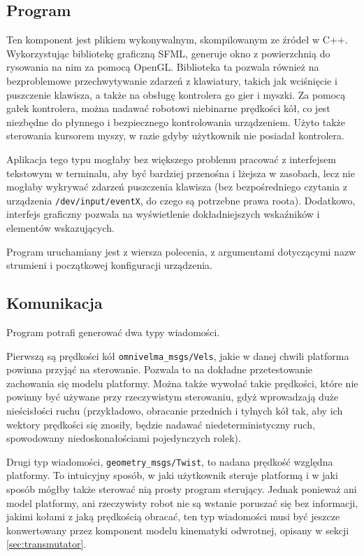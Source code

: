 	\subsection{Program}
		Ten komponent jest plikiem wykonywalnym, skompilowanym ze źródeł w C++.
		Wykorzystując bibliotekę graficzną SFML, generuje okno z powierzchnią do rysowania na nim za pomocą OpenGL.
		Biblioteka ta pozwala również na bezproblemowe przechwytywanie zdarzeń z klawiatury, takich jak wciśnięcie i puszczenie klawisza, a także na obsługę kontrolera go gier i myszki.
		Za pomocą gałek kontrolera, można nadawać robotowi niebinarne prędkości kół, co jest niezbędne do płynnego i bezpiecznego kontrolowania urządzeniem.
		Użyto także sterowania kursorem myszy, w razie gdyby użytkownik nie posiadał kontrolera.
		
		Aplikacja tego typu mogłaby bez większego problemu pracować z interfejsem tekstowym w terminalu, aby być bardziej przenośna i lżejsza w zasobach, 
		lecz nie mogłaby wykrywać zdarzeń puszczenia klawisza
		(bez bezpośredniego czytania z urządzenia \texttt{/dev/input/eventX}, do czego są potrzebne prawa roota). 
		Dodatkowo, interfejs graficzny pozwala na wyświetlenie dokładniejszych wskaźników i elementów wskazujących.
		
		Program uruchamiany jest z wiersza polecenia, z argumentami dotyczącymi nazw strumieni i początkowej konfiguracji urządzenia.
	
	\subsection{Komunikacja}
		Program potrafi generować dwa typy wiadomości.
		
		Pierwszą są prędkości kół \texttt{omnivelma\_msgs/Vels}, jakie w danej chwili platforma powinna przyjąć na sterowanie.
		Pozwala to na dokładne przetestowanie zachowania się modelu platformy.
		Można także wywołać takie prędkości, które nie powinny być używane przy rzeczywistym sterowaniu, gdyż wprowadzają duże nieścisłości ruchu 
		(przykładowo, obracanie przednich i tylnych kół tak, aby ich wektory prędkości się znosiły, będzie nadawać niedeterministyczny ruch, spowodowany niedoskonałościami
		pojedynczych rolek).
		
		Drugi typ wiadomości, \texttt{geometry\_msgs/Twist}, to nadana prędkość względna platformy.
		To intuicyjny sposób, w jaki użytkownik steruje platformą i w jaki sposób mógłby także sterować nią prosty program sterujący.
		Jednak ponieważ ani model platformy, ani rzeczywisty robot nie są wstanie poruszać się bez informacji, jakimi kołami z jaką prędkością obracać,
		ten typ wiadomości musi być jeszcze konwertowany przez komponent modelu kinematyki odwrotnej, opisany w sekcji \ref{sec:transmutator}.
		
